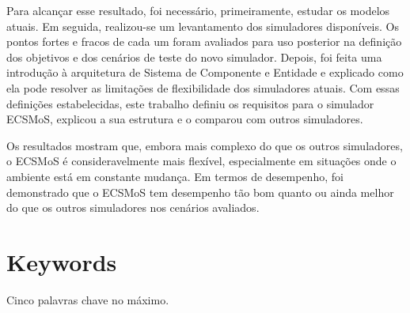 \documentclass[twoside, 11pt]{article}
\begin{document}
Para alcançar esse resultado, foi necessário, primeiramente, estudar os modelos atuais. Em seguida, realizou-se um levantamento dos simuladores disponíveis. Os pontos fortes e fracos de cada um foram avaliados para uso posterior na definição dos objetivos e dos cenários de teste do novo simulador. Depois, foi feita uma introdução à arquitetura de Sistema de Componente e Entidade e explicado como ela pode resolver as limitações de flexibilidade dos simuladores atuais. Com essas definições estabelecidas, este trabalho definiu os requisitos para o simulador ECSMoS, explicou a sua estrutura e o comparou com outros simuladores.

Os resultados mostram que, embora mais complexo do que os outros simuladores, o ECSMoS é consideravelmente mais flexível, especialmente em situações onde o ambiente está em constante mudança. Em termos de desempenho, foi demonstrado que o ECSMoS tem desempenho tão bom quanto ou ainda melhor do que os outros simuladores nos cenários avaliados.

\section*{Keywords}

Cinco palavras chave no máximo.

\clearpage            %
\null                %
\newpage             %

\printglossary[type=\acronymtype,nonumberlist, title=List of Abbreviations]

\clearpage            %
\null                %
\newpage             %

\renewcommand{\contentsname}{General Index}
\tableofcontents

\clearpage            %
\null                %
\newpage             %

\renewcommand{\listfigurename}{Figure Index}
\listoffigures

\clearpage            %
\null                %
\newpage             %

\renewcommand{\listtablename}{Table Index}
\listoftables
\end{document}
